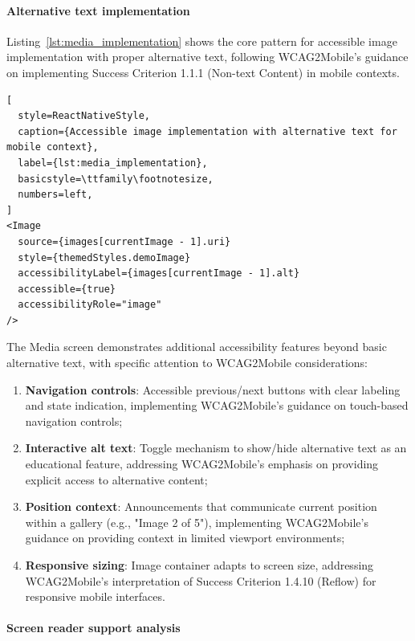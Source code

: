 \FloatBarrier

\paragraph{Alternative text implementation}

Listing~\ref{lst:media_implementation} shows the core pattern for accessible image implementation with proper alternative text, following WCAG2Mobile's guidance on implementing Success Criterion 1.1.1 (Non-text Content) in mobile contexts.

\begin{lstlisting}[
  style=ReactNativeStyle,
  caption={Accessible image implementation with alternative text for mobile context},
  label={lst:media_implementation},
  basicstyle=\ttfamily\footnotesize,
  numbers=left,
]
<Image
  source={images[currentImage - 1].uri}
  style={themedStyles.demoImage}
  accessibilityLabel={images[currentImage - 1].alt}
  accessible={true}
  accessibilityRole="image"
/>
\end{lstlisting}
\FloatBarrier

The Media screen demonstrates additional accessibility features beyond basic alternative text, with specific attention to WCAG2Mobile considerations:

\begin{enumerate}
    \item \textbf{Navigation controls}: Accessible previous/next buttons with clear labeling and state indication, implementing WCAG2Mobile's guidance on touch-based navigation controls;
    
    \item \textbf{Interactive alt text}: Toggle mechanism to show/hide alternative text as an educational feature, addressing WCAG2Mobile's emphasis on providing explicit access to alternative content;
    
    \item \textbf{Position context}: Announcements that communicate current position within a gallery (e.g., "Image 2 of 5"), implementing WCAG2Mobile's guidance on providing context in limited viewport environments;
    
    \item \textbf{Responsive sizing}: Image container adapts to screen size, addressing WCAG2Mobile's interpretation of Success Criterion 1.4.10 (Reflow) for responsive mobile interfaces.
\end{enumerate}

\paragraph{Screen reader support analysis}

